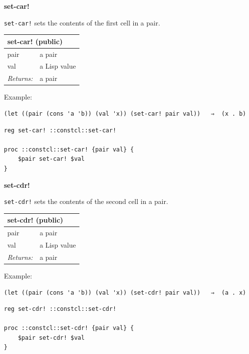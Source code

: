 \documentclass[twoside,9pt]{report}
\begin{document}
\textbf{set-car!}


\texttt{set-car!} sets the contents of the first cell in a pair.

\begin{tabular}{ |l l| }
\hline
\multicolumn{2}{|l|}{set-car! (public)} \\
\hline
pair & a pair \\
val & a Lisp value \\
\textit{Returns:} & a pair \\
\hline
\end{tabular}


Example:

\noindent\makebox[\linewidth]{\rule{\linewidth}{0.4pt}}
\begin{lstlisting}
(let ((pair (cons 'a 'b)) (val 'x)) (set-car! pair val))   ⇒  (x . b)
\end{lstlisting}
\noindent\makebox[\linewidth]{\rule{\linewidth}{0.4pt}}
\noindent\makebox[\linewidth]{\rule{\linewidth}{0.4pt}}
\begin{lstlisting}
reg set-car! ::constcl::set-car!
 
proc ::constcl::set-car! {pair val} {
    $pair set-car! $val
}
\end{lstlisting}
\noindent\makebox[\linewidth]{\rule{\linewidth}{0.4pt}}

\textbf{set-cdr!}


\texttt{set-cdr!} sets the contents of the second cell in a pair.

\begin{tabular}{ |l l| }
\hline
\multicolumn{2}{|l|}{set-cdr! (public)} \\
\hline
pair & a pair \\
val & a Lisp value \\
\textit{Returns:} & a pair \\
\hline
\end{tabular}


Example:

\noindent\makebox[\linewidth]{\rule{\linewidth}{0.4pt}}
\begin{lstlisting}
(let ((pair (cons 'a 'b)) (val 'x)) (set-cdr! pair val))   ⇒  (a . x)
\end{lstlisting}
\noindent\makebox[\linewidth]{\rule{\linewidth}{0.4pt}}
\noindent\makebox[\linewidth]{\rule{\linewidth}{0.4pt}}
\begin{lstlisting}
reg set-cdr! ::constcl::set-cdr!
 
proc ::constcl::set-cdr! {pair val} {
    $pair set-cdr! $val
}
\end{lstlisting}
\noindent\makebox[\linewidth]{\rule{\linewidth}{0.4pt}}
\end{document}
